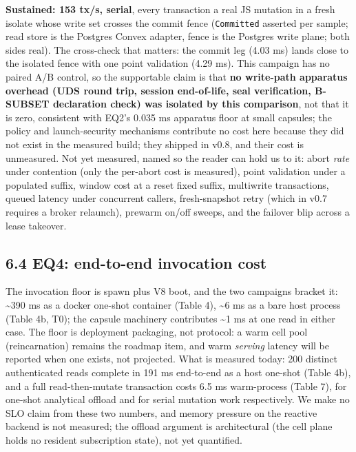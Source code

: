 \documentclass[
  11pt,
]{article}
\begin{document}
\textbf{Sustained: 153 tx/s, serial}, every transaction a real JS mutation in a fresh isolate whose write set crosses the commit fence (\texttt{Committed} asserted per sample; read store is the Postgres Convex adapter, fence is the Postgres write plane; both sides real). The cross-check that matters: the commit leg (4.03 ms) lands close to the isolated fence with one point validation (4.29 ms). This campaign has no paired A/B control, so the supportable claim is that \textbf{no write-path apparatus overhead (UDS round trip, session end-of-life, seal verification, B-SUBSET declaration check) was isolated by this comparison}, not that it is zero, consistent with EQ2's 0.035 ms apparatus floor at small capsules; the policy and launch-security mechanisms contribute no cost here because they did not exist in the measured build; they shipped in v0.8, and their cost is unmeasured. Not yet measured, named so the reader can hold us to it: abort \emph{rate} under contention (only the per-abort cost is measured), point validation under a populated suffix, window cost at a reset fixed suffix, multiwrite transactions, queued latency under concurrent callers, fresh-snapshot retry (which in v0.7 requires a broker relaunch), prewarm on/off sweeps, and the failover blip across a lease takeover.

\subsection{6.4 EQ4: end-to-end invocation cost}\label{eq4-end-to-end-invocation-cost}

The invocation floor is spawn plus V8 boot, and the two campaigns bracket it: \textasciitilde390 ms as a docker one-shot container (Table 4), \textasciitilde6 ms as a bare host process (Table 4b, T0); the capsule machinery contributes \textasciitilde1 ms at one read in either case. The floor is deployment packaging, not protocol: a warm cell pool (reincarnation) remains the roadmap item, and warm \emph{serving} latency will be reported when one exists, not projected. What is measured today: 200 distinct authenticated reads complete in 191 ms end-to-end as a host one-shot (Table 4b), and a full read-then-mutate transaction costs 6.5 ms warm-process (Table 7), for one-shot analytical offload and for serial mutation work respectively. We make no SLO claim from these two numbers, and memory pressure on the reactive backend is not measured; the offload argument is architectural (the cell plane holds no resident subscription state), not yet quantified.
\end{document}
